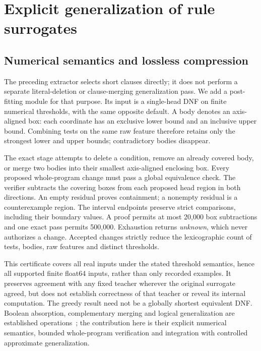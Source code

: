 \section{Explicit generalization of rule surrogates}\label{sec:generalization}
\subsection{Numerical semantics and lossless compression}
The preceding extractor selects short clauses directly; it does not perform a separate literal-deletion or clause-merging generalization pass. We add a post-fitting module for that purpose. Its input is a single-head DNF on finite numerical thresholds, with the same opposite default. A body denotes an axis-aligned box: each coordinate has an exclusive lower bound and an inclusive upper bound. Combining tests on the same raw feature therefore retains only the strongest lower and upper bounds; contradictory bodies disappear.

The exact stage attempts to delete a condition, remove an already covered body, or merge two bodies into their smallest axis-aligned enclosing box. Every proposed whole-program change must pass a global equivalence check. The verifier subtracts the covering boxes from each proposed head region in both directions. An empty residual proves containment; a nonempty residual is a counterexample region. The interval endpoints preserve strict comparisons, including their boundary values. A proof permits at most 20,000 box subtractions and one exact pass permits 500,000. Exhaustion returns \emph{unknown}, which never authorizes a change. Accepted changes strictly reduce the lexicographic count of tests, bodies, raw features and distinct thresholds.

This certificate covers all real inputs under the stated threshold semantics, hence all supported finite float64 inputs, rather than only recorded examples. It preserves agreement with any fixed teacher wherever the original surrogate agreed, but does not establish correctness of that teacher or reveal its internal computation. The greedy result need not be a globally shortest equivalent DNF. Boolean absorption, complementary merging and logical generalization are established operations~\citep{nienhuys1996}; the contribution here is their explicit numerical semantics, bounded whole-program verification and integration with controlled approximate generalization.

